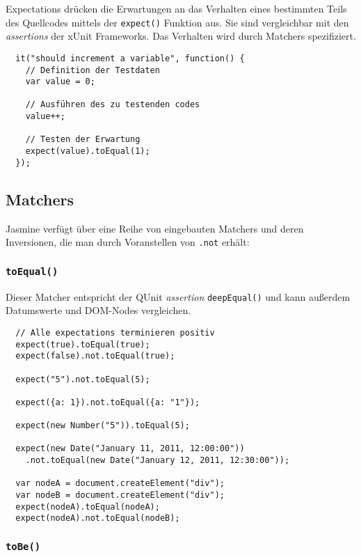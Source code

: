 \documentclass[11pt, a4paper]{article}
\begin{document}
Expectations drücken die Erwartungen an das Verhalten eines bestimmten Teils des
Quellcodes mittels der \texttt{expect()} Funktion aus. Sie sind vergleichbar mit
den \emph{assertions} der xUnit Frameworks. Das Verhalten wird durch Matchers
spezifiziert.

\begin{verbatim}
  it("should increment a variable", function() {
    // Definition der Testdaten
    var value = 0;

    // Ausführen des zu testenden codes
    value++;

    // Testen der Erwartung
    expect(value).toEqual(1);
  });
\end{verbatim}

\subsection{Matchers}

Jasmine verfügt über eine Reihe von eingebauten Matchers und deren Inversionen,
die man durch Voranstellen von \texttt{.not} erhält:

\subsubsection*{\texttt{toEqual()}}

Dieser Matcher entspricht der QUnit \emph{assertion} \texttt{deepEqual()} und
kann außerdem Datumswerte und DOM-Nodes vergleichen.

\begin{verbatim}
  // Alle expectations terminieren positiv
  expect(true).toEqual(true);
  expect(false).not.toEqual(true);

  expect("5").not.toEqual(5);

  expect({a: 1}).not.toEqual({a: "1"});

  expect(new Number("5")).toEqual(5);

  expect(new Date("January 11, 2011, 12:00:00"))
    .not.toEqual(new Date("January 12, 2011, 12:30:00"));

  var nodeA = document.createElement("div");
  var nodeB = document.createElement("div");
  expect(nodeA).toEqual(nodeA);
  expect(nodeA).not.toEqual(nodeB);
\end{verbatim}

\subsubsection*{\texttt{toBe()}}
\end{document}
